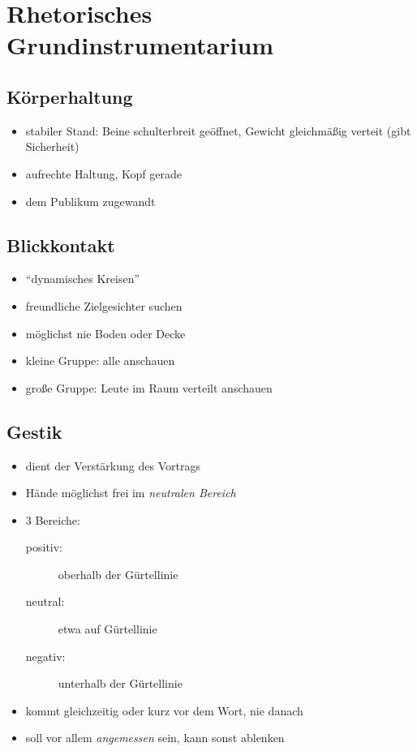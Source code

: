 \section{Rhetorisches Grundinstrumentarium}
\subsection{Körperhaltung}
\begin{itemize}
\item stabiler Stand: Beine schulterbreit geöffnet, Gewicht gleichmäßig verteit (gibt Sicherheit)
\item aufrechte Haltung, Kopf gerade
\item dem Publikum zugewandt
\end{itemize}

\subsection{Blickkontakt}
\begin{itemize}
\item "`dynamisches Kreisen"'
\item freundliche Zielgesichter suchen
\item möglichst nie Boden oder Decke
\item kleine Gruppe: alle anschauen
\item große Gruppe: Leute im Raum verteilt anschauen
\end{itemize}

\subsection{Gestik}
\begin{itemize}
\item dient der Verstärkung des Vortrags
\item Hände möglichst frei im \emph{neutralen Bereich}
\item 3 Bereiche:
  \begin{description}
    \item [positiv:] oberhalb der Gürtellinie
    \item [neutral:] etwa auf Gürtellinie
    \item [negativ:] unterhalb der Gürtellinie
  \end{description}
\item kommt gleichzeitig oder kurz vor dem Wort, nie danach
\item soll vor allem \emph{angemessen} sein, kann sonst ablenken
\end{itemize}

